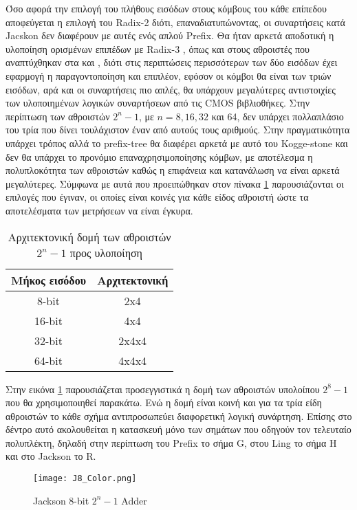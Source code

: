 Όσο αφορά την επιλογή του πλήθους εισόδων στους κόμβους του κάθε επίπεδου αποφεύγεται
η επιλογή του Radix-2 διότι, επαναδιατυπώνοντας, οι συναρτήσεις κατά Jacskon δεν διαφέρουν 
με αυτές ενός απλού Prefix. Θα ήταν αρκετά αποδοτική η υλοποίηση ορισμένων επιπέδων με Radix-3
, όπως και στους αθροιστές που αναπτύχθηκαν στα \cite{6189978} και \cite{6810474}, διότι
στις περιπτώσεις περισσότερων των δύο εισόδων έχει εφαρμογή η παραγοντοποίηση και επιπλέον, εφόσον 
οι κόμβοι θα είναι των τριών εισόδων, αρά και οι συναρτήσεις πιο απλές, θα υπάρχουν μεγαλύτερες 
αντιστοιχίες των υλοποιημένων λογικών συναρτήσεων από τις CMOS βιβλιοθήκες. Στην περίπτωση των 
αθροιστών $2^n-1$, με $n=8, 16, 32$ και 64, δεν υπάρχει πολλαπλάσιο του τρία που δίνει τουλάχιστον έναν 
από αυτούς τους αριθμούς. Στην πραγματικότητα υπάρχει τρόπος αλλά το prefix-tree θα διαφέρει αρκετά με αυτό
του Kogge-stone και δεν θα υπάρχει το προνόμιο επαναχρησιμοποίησης κόμβων, με αποτέλεσμα η πολυπλοκότητα των
αθροιστών καθώς η επιφάνεια και κατανάλωση να είναι αρκετά μεγαλύτερες.
Σύμφωνα με αυτά που προειπώθηκαν στον πίνακα \ref{tb:arch_2^n-1} παρουσιάζονται οι επιλογές που έγιναν, οι οποίες
είναι κοινές για κάθε είδος αθροιστή ώστε τα αποτελέσματα των μετρήσεων να είναι έγκυρα.
\begin{table}[H]
\centering
     \begin{tabular}{ || c | c || } 
     \hline
     Μήκος εισόδου & Αρχιτεκτονική\\
     \hline\hline
     8-bit  & 2x4 \\
     16-bit & 4x4 \\
     32-bit & 2x4x4 \\
     64-bit & 4x4x4 \\
     \hline
     \end{tabular}
     \caption{Αρχιτεκτονική δομή των αθροιστών $2^n-1$ προς υλοποίηση}
     \label{tb:arch_2^n-1}
\end{table}

Στην εικόνα \ref{2^8-1_Tree_2x4} παρουσιάζεται προσεγγιστικά η δομή των αθροιστών υπολοίπου $2^8-1$ 
που θα χρησιμοποιηθεί παρακάτω. Ενώ η δομή είναι κοινή και για τα τρία είδη αθροιστών το κάθε σχήμα 
αντιπροσωπεύει διαφορετική λογική συνάρτηση. Επίσης στο δέντρο αυτό ακολουθείται η κατασκευή μόνο 
των σημάτων που οδηγούν τον τελευταίο πολυπλέκτη, δηλαδή στην περίπτωση του Prefix το σήμα G, στου Ling
το σήμα H και στο Jackson το R.
\begin{figure}[H]
\centering
\texttt{[image: J8\_Color.png]}
\caption{Jackson 8-bit $2^n-1$ Adder}
\label{2^8-1_Tree_2x4}
\end{figure}


















